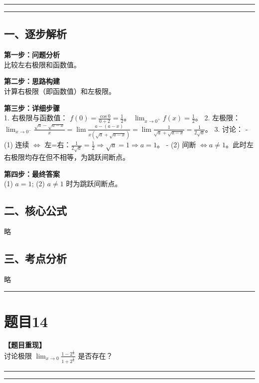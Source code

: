 \documentclass[12pt, a4paper]{ctexart}
\newcommand{\TopSeparator}{
    \par\noindent\rule{\textwidth}{1.5pt}\vspace{0.5em} %
}
\newcommand{\AnalysisSeparator}{
    \par\noindent\rule{\textwidth}{0.5pt}\vspace{0.2em}\hrule\vspace{0.5em} %
}
\newenvironment{RedAnalysis}{
    \par
    \color{red} %
}{
    \par
    \color{black} %
}
\begin{document}
\AnalysisSeparator

\begin{RedAnalysis}

\subsection*{一、逐步解析}

\textbf{第一步：问题分析} \\
比较左右极限和函数值。

\textbf{第二步：思路构建} \\
计算右极限（即函数值）和左极限。

\textbf{第三步：详细步骤} \\
1. 右极限与函数值：
   $f(0) = \frac{\cos 0}{0+2} = \frac{1}{2}$。
   $\lim_{x\to 0^+} f(x) = \frac{1}{2}$。
2. 左极限：
   $\lim_{x\to 0^-} \frac{\sqrt{a}-\sqrt{a-x}}{x} = \lim \frac{a-(a-x)}{x(\sqrt{a}+\sqrt{a-x})} = \lim \frac{1}{\sqrt{a}+\sqrt{a-x}} = \frac{1}{2\sqrt{a}}$。
3. 讨论：
   - (1) 连续 $\iff$ 左=右：$\frac{1}{2\sqrt{a}} = \frac{1}{2} \Rightarrow \sqrt{a}=1 \Rightarrow a=1$。
   - (2) 间断 $\iff a \ne 1$。此时左右极限均存在但不相等，为跳跃间断点。

\textbf{第四步：最终答案} \\
(1) $a=1$; (2) $a \ne 1$ 时为跳跃间断点。

\subsection*{二、核心公式}
略

\subsection*{三、考点分析}
略

\end{RedAnalysis}

\vspace{2em}

\TopSeparator
\section*{题目14}

\textbf{【题目重现】} \\
讨论极限 $ \lim_{x \to 0} \frac{1 - 2^{\frac{1}{x}}}{1 + 2^{\frac{1}{x}}} $ 是否存在？

\AnalysisSeparator
\end{document}
